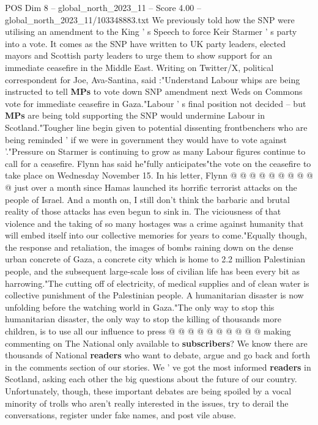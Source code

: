 \begin{textsample}{POS Dim 8 – global\_north\_2023\_11 – Score 4.00 – global\_north\_2023\_11/103348883.txt}  \label{ex:f8_pos_190}
We previously told how the SNP were utilising an amendment to the King ' s Speech to force Keir Starmer ' s party into a vote.
It comes as the SNP have written to UK party leaders, elected mayors and Scottish party leaders to urge them to show support for an immediate ceasefire in the Middle East.
Writing on Twitter/X, political correspondent for Joe, Ava-Santina, said :"Understand Labour whips are being instructed to tell \textbf{MPs} to vote down SNP amendment next Weds on Commons vote for immediate ceasefire in Gaza."Labour ' s final position not decided -- but \textbf{MPs} are being told supporting the SNP would undermine Labour in Scotland."Tougher line begin given to potential dissenting frontbenchers who are being reminded ' if we were in government they would have to vote against '."Pressure on Starmer is continuing to grow as many Labour figures continue to call for a ceasefire.
Flynn has said he"fully anticipates"the vote on the ceasefire to take place on Wednesday November 15.
In his letter, Flynn @ @ @ @ @ @ @ @ @ @ just over a month since Hamas launched its horrific terrorist attacks on the people of Israel.
And a month on, I still don't think the barbaric and brutal reality of those attacks has even begun to sink in.
The viciousness of that violence and the taking of so many hostages was a crime against humanity that will embed itself into our collective memories for years to come."Equally though, the response and retaliation, the images of bombs raining down on the dense urban concrete of Gaza, a concrete city which is home to 2.2 million Palestinian people, and the subsequent large-scale loss of civilian life has been every bit as harrowing."The cutting off of electricity, of medical supplies and of clean water is collective punishment of the Palestinian people.
A humanitarian disaster is now unfolding before the watching world in Gaza."The only way to stop this humanitarian disaster, the only way to stop the killing of thousands more children, is to use all our influence to press @ @ @ @ @ @ @ @ @ @ making commenting on The National only available to \textbf{subscribers}?
We know there are thousands of National \textbf{readers} who want to debate, argue and go back and forth in the comments section of our stories.
We ' ve got the most informed \textbf{readers} in Scotland, asking each other the big questions about the future of our country.
Unfortunately, though, these important debates are being spoiled by a vocal minority of trolls who aren't really interested in the issues, try to derail the conversations, register under fake names, and post vile abuse.

\end{textsample}

